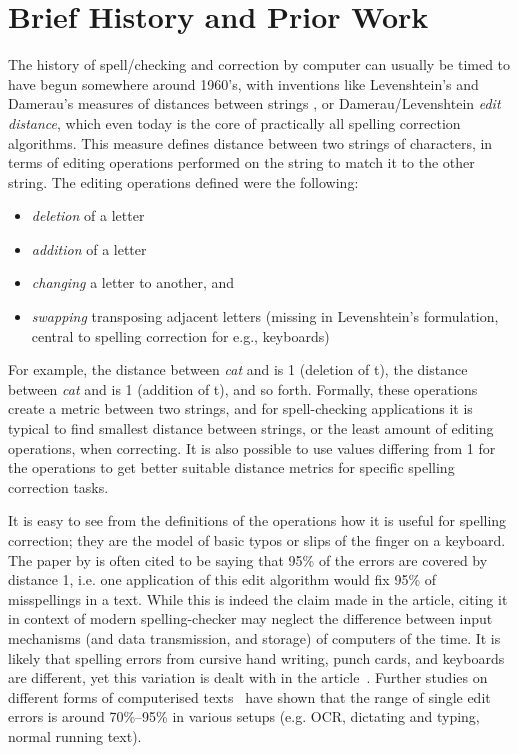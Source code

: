 \documentclass[officiallayout]{unihelcompling}
\newcommand\misspelt{\bgroup\markoverwith
{\textcolor{red}{\lower3.5pt\hbox{\sixly \char58}}}\ULon}
\begin{document}
\section{Brief History and Prior Work}
\label{sec:history}

The history of spell\-/checking and correction by computer can usually be timed
to have begun somewhere around 1960's, with inventions like Levenshtein's and
Damerau's measures of distances between strings
\citep{levenshtein1966binary,damerau1964technique}, or Damerau\-/Levenshtein
\emph{edit distance}, which even today is the core of practically all spelling
correction algorithms. This measure defines distance between two strings of
characters, in terms of editing operations performed on the string to match it
to the other string. The editing operations defined were the following:

\begin{itemize}
    \item \emph{deletion} of a letter
    \item \emph{addition} of a letter
    \item \emph{changing} a letter to another, and
    \item \emph{swapping} transposing adjacent letters (missing in
        Levenshtein's formulation, central to spelling correction for
        e.g., keyboards)
\end{itemize}

For example, the distance between \emph{cat} and \misspelt{ca} is 1 (deletion
of t), the distance between \emph{cat} and \misspelt{catt} is 1 (addition of
t), and so forth. Formally, these operations create a metric between two
strings, and for spell-checking applications it is typical to find smallest
distance between strings, or the least amount of editing operations, when
correcting. It is also possible to use values differing from 1 for the
operations to get better suitable distance metrics for specific spelling
correction tasks.

It is easy to see from the definitions of the operations how it is useful
for spelling correction; they are the model of basic typos or slips of the
finger on a keyboard. The paper by \citet{damerau1964technique} is often cited
to be saying that 95\% of the errors are covered by distance 1, i.e. one
application of this edit algorithm would fix 95\% of misspellings in a text.
While this is indeed the claim made in the article, citing it in context of
modern spelling-checker may neglect the difference between input mechanisms
(and data transmission, and storage) of computers of the time. It is likely
that spelling errors from cursive hand writing, punch cards, and keyboards are
different, yet this variation is dealt with in the
article~\citep{damerau1964technique}. Further studies on different forms of
computerised texts~\citep{kukich1992techniques} have shown that the range of
single edit errors is around 70\%--95\% in various setups (e.g. OCR,
dictating and typing, normal running text).
\end{document}
